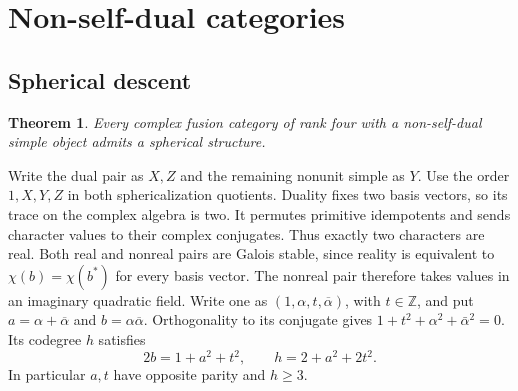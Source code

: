 \documentclass[11pt,a4paper]{article}
\newtheorem{theorem}{Theorem}[section]
\theoremstyle{definition}\newtheorem{definition}[theorem]{Definition}
\theoremstyle{remark}\newtheorem{remark}[theorem]{Remark}
\newcommand{\ZZ}{\mathbb Z}
\numberwithin{equation}{section}
\begin{document}
\section{Non-self-dual categories}\label{sec:ns}

\subsection{Spherical descent}
\begin{theorem}\label{ns:thm:ns-spherical}
Every complex fusion category of rank four with a non-self-dual simple
object admits a spherical structure.
\end{theorem}

Write the dual pair as $X,Z$ and the remaining nonunit simple as $Y$.
Use the order $1,X,Y,Z$ in both sphericalization quotients. Duality fixes two basis
vectors, so its trace on the complex algebra is two. It permutes
primitive idempotents and sends character values to their complex
conjugates. Thus exactly two characters are real. Both real and
nonreal pairs are Galois stable, since reality is equivalent to
$\chi(b)=\chi(b^*)$ for every basis vector. The nonreal pair
therefore takes values in an imaginary quadratic field. Write one
as $(1,\alpha,t,\overline\alpha)$, with $t\in\ZZ$, and put
$a=\alpha+\overline\alpha$ and $b=\alpha\overline\alpha$.
Orthogonality to its conjugate gives $1+t^2+\alpha^2+\bar\alpha^2=0$.
Its codegree $h$ satisfies
\begin{equation}\label{ns:eq:ns-nonreal}
 2b=1+a^2+t^2,\qquad h=2+a^2+2t^2.
\end{equation}
In particular $a,t$ have opposite parity and $h\ge3$.
\end{document}
